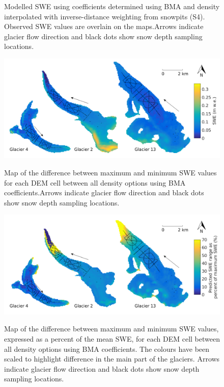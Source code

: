 \documentclass{sfuthesis}
\newcommand{\topomap}{Arrows indicate glacier flow direction and black dots show snow depth sampling locations. }
\begin{document}
\begin{figure}[H]
	\caption{Modelled SWE using coefficients determined using BMA and density interpolated with inverse-distance weighting from snowpits (S4). Observed SWE values are overlain on the maps.\topomap}
	\label{fig:BMSmodelledSWE}
\end{figure}
 
\begin{figure}[H]
	\centering
	\includegraphics[width =\textwidth]{BMS_SWEdifferenceMap.png}\\
	\caption{Map of the difference between maximum and minimum SWE values for each DEM cell between all density options using BMA coefficients.\topomap}
	\label{fig:BMS_SWEdiffMap}
\end{figure} 
 
 \begin{figure}[H]
	\centering
	\includegraphics[width =\textwidth]{BMS_SWEdifferenceMap_percent.png}\\
	\caption{Map of the difference between maximum and minimum SWE values, expressed as a percent of the mean SWE, for each DEM cell between all density options using BMA coefficients. The colours have been scaled to highlight difference in the main part of the glaciers. \topomap}
	\label{fig:BMS_SWEdiffMap_precent}
\end{figure} 
\end{document}
